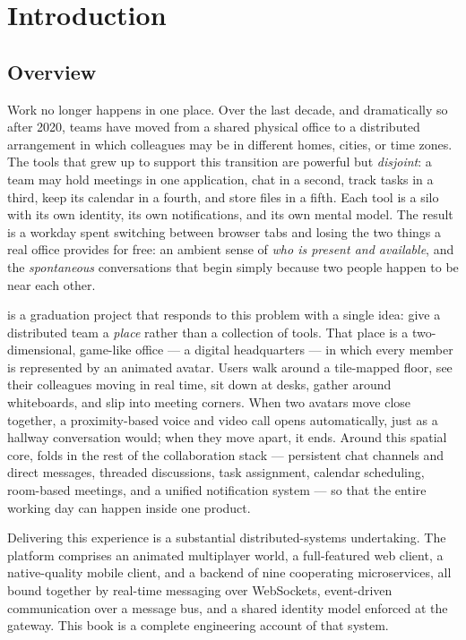 \chapter{Introduction}
\label{ch:introduction}

\section{Overview}

Work no longer happens in one place. Over the last decade, and dramatically so
after 2020, teams have moved from a shared physical office to a distributed
arrangement in which colleagues may be in different homes, cities, or time
zones. The tools that grew up to support this transition are powerful but
\emph{disjoint}: a team may hold meetings in one application, chat in a second,
track tasks in a third, keep its calendar in a fourth, and store files in a
fifth. Each tool is a silo with its own identity, its own notifications, and its
own mental model. The result is a workday spent switching between browser tabs
and losing the two things a real office provides for free: an ambient sense of
\emph{who is present and available}, and the \emph{spontaneous} conversations
that begin simply because two people happen to be near each other.

\voname{} is a graduation project that responds to this problem with a single
idea: give a distributed team a \emph{place} rather than a collection of tools.
That place is a two-dimensional, game-like office --- a digital headquarters ---
in which every member is represented by an animated avatar. Users walk around a
tile-mapped floor, see their colleagues moving in real time, sit down at desks,
gather around whiteboards, and slip into meeting corners. When two avatars move
close together, a proximity-based voice and video call opens automatically, just
as a hallway conversation would; when they move apart, it ends. Around this
spatial core, \voname{} folds in the rest of the collaboration stack ---
persistent chat channels and direct messages, threaded discussions, task
assignment, calendar scheduling, room-based meetings, and a unified notification
system --- so that the entire working day can happen inside one product.

Delivering this experience is a substantial distributed-systems undertaking. The
platform comprises an animated multiplayer world, a full-featured web client, a
native-quality mobile client, and a backend of nine cooperating microservices,
all bound together by real-time messaging over WebSockets, event-driven
communication over a message bus, and a shared identity model enforced at the
gateway. This book is a complete engineering account of that system.

